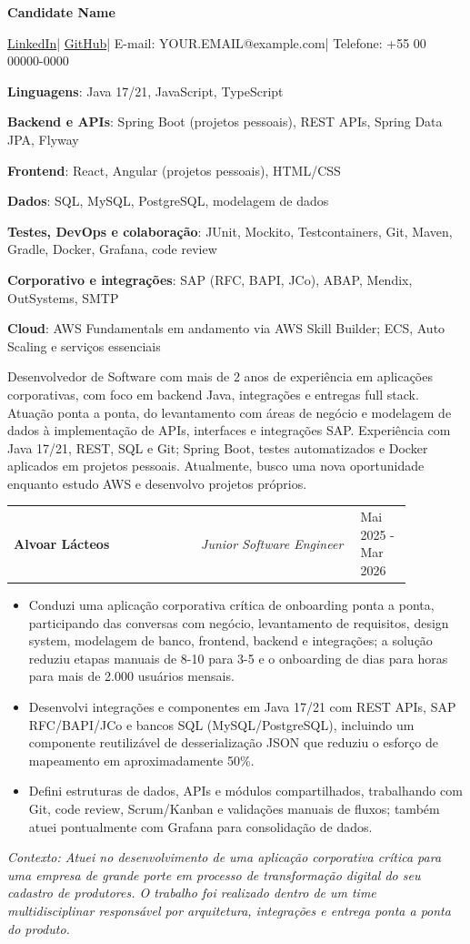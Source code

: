 \documentclass[10pt,letterpaper]{article}
\makeatletter
\newcommand{\cvname}[1]{{\rmfamily\bfseries\fontsize{25}{28}\selectfont #1}\par\vspace{2pt}}
\newcommand{\contactline}[1]{{\sffamily\fontsize{9.5}{12}\selectfont #1}\par\vspace{12pt}}
\newcommand{\sectiontitle}[1]{\vspace{4pt}{\sffamily\bfseries\fontsize{15}{18}\selectfont #1}\par\vspace{1pt}{\color{rulegray}\rule{\linewidth}{0.45pt}}\par\vspace{5pt}}
\newcommand{\skillline}[2]{{\rmfamily\fontsize{10}{12}\selectfont\textbf{#1}: #2\par}}
\newcommand{\experienceentry}[3]{\begin{tabularx}{\linewidth}{@{}p{0.47\linewidth}@{}p{0.40\linewidth}@{}>{\raggedleft\arraybackslash}X@{}}{\rmfamily\bfseries #1} & {\rmfamily\itshape #2} & {\rmfamily #3}\\\end{tabularx}}
\newenvironment{cvbullets}{\begin{itemize}[leftmargin=15pt,itemsep=1pt,topsep=0pt,parsep=0pt,partopsep=0pt]\rmfamily\fontsize{10}{12}\selectfont}{\end{itemize}}
\newcommand{\contextline}[1]{{\rmfamily\itshape\color{contextgray}\fontsize{9.5}{11.5}\selectfont Contexto: #1\par}}
\makeatother
\begin{document}
\cvname{Candidate Name}
\contactline{\href{https://www.linkedin.com/in/PLACEHOLDER}{LinkedIn}\enspace | \enspace\href{https://github.com/PLACEHOLDER}{GitHub}\enspace | \enspace E-mail: YOUR.EMAIL@example.com\enspace | \enspace Telefone: +55 00 00000-0000}

\sectiontitle{Habilidades}
\skillline{Linguagens}{Java 17/21, JavaScript, TypeScript}
\skillline{Backend e APIs}{Spring Boot (projetos pessoais), REST APIs, Spring Data JPA, Flyway}
\skillline{Frontend}{React, Angular (projetos pessoais), HTML/CSS}
\skillline{Dados}{SQL, MySQL, PostgreSQL, modelagem de dados}
\skillline{Testes, DevOps e colaboração}{JUnit, Mockito, Testcontainers, Git, Maven, Gradle, Docker, Grafana, code review}
\skillline{Corporativo e integrações}{SAP (RFC, BAPI, JCo), ABAP, Mendix, OutSystems, SMTP}
\skillline{Cloud}{AWS Fundamentals em andamento via AWS Skill Builder; ECS, Auto Scaling e serviços essenciais}

\sectiontitle{Resumo}
{\rmfamily\fontsize{10}{12}\selectfont Desenvolvedor de Software com mais de 2 anos de experiência em aplicações corporativas, com foco em backend Java, integrações e entregas full stack. Atuação ponta a ponta, do levantamento com áreas de negócio e modelagem de dados à implementação de APIs, interfaces e integrações SAP. Experiência com Java 17/21, REST, SQL e Git; Spring Boot, testes automatizados e Docker aplicados em projetos pessoais. Atualmente, busco uma nova oportunidade enquanto estudo AWS e desenvolvo projetos próprios.\par}

\sectiontitle{Experiências}
\experienceentry{Alvoar Lácteos}{Junior Software Engineer}{Mai 2025 - Mar 2026}
\begin{cvbullets}
\item Conduzi uma aplicação corporativa crítica de onboarding ponta a ponta, participando das conversas com negócio, levantamento de requisitos, design system, modelagem de banco, frontend, backend e integrações; a solução reduziu etapas manuais de 8-10 para 3-5 e o onboarding de dias para horas para mais de 2.000 usuários mensais.
\item Desenvolvi integrações e componentes em Java 17/21 com REST APIs, SAP RFC/BAPI/JCo e bancos SQL (MySQL/PostgreSQL), incluindo um componente reutilizável de desserialização JSON que reduziu o esforço de mapeamento em aproximadamente 50\%.
\item Defini estruturas de dados, APIs e módulos compartilhados, trabalhando com Git, code review, Scrum/Kanban e validações manuais de fluxos; também atuei pontualmente com Grafana para consolidação de dados.
\end{cvbullets}
\contextline{Atuei no desenvolvimento de uma aplicação corporativa crítica para uma empresa de grande porte em processo de transformação digital do seu cadastro de produtores. O trabalho foi realizado dentro de um time multidisciplinar responsável por arquitetura, integrações e entrega ponta a ponta do produto.}
\end{document}
